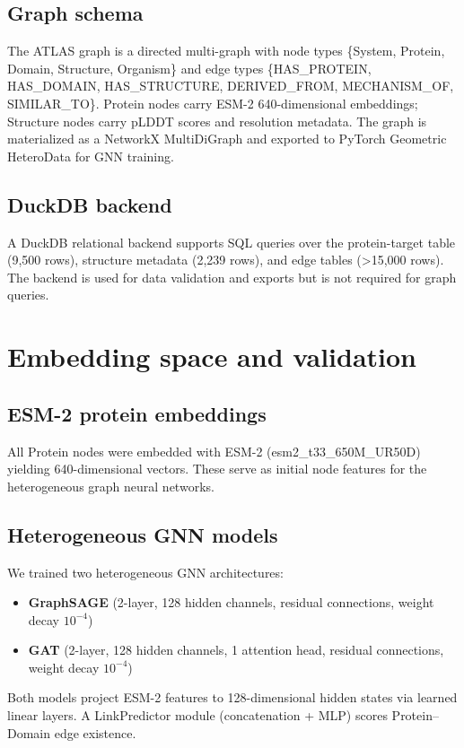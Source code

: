 \documentclass[11pt,a4paper]{article}
\begin{document}
\subsection*{Graph schema}
The ATLAS graph is a directed multi-graph with node types \{System, Protein, Domain, Structure, Organism\} and edge types \{HAS\_PROTEIN, HAS\_DOMAIN, HAS\_STRUCTURE, DERIVED\_FROM, MECHANISM\_OF, SIMILAR\_TO\}. Protein nodes carry ESM-2 640-dimensional embeddings; Structure nodes carry pLDDT scores and resolution metadata. The graph is materialized as a NetworkX MultiDiGraph and exported to PyTorch Geometric HeteroData for GNN training.

\subsection*{DuckDB backend}
A DuckDB relational backend supports SQL queries over the protein-target table (9,500 rows), structure metadata (2,239 rows), and edge tables (\textgreater{}15,000 rows). The backend is used for data validation and exports but is not required for graph queries.

\section*{Embedding space and validation}

\subsection*{ESM-2 protein embeddings}
All Protein nodes were embedded with ESM-2 (esm2\_t33\_650M\_UR50D) yielding 640-dimensional vectors. These serve as initial node features for the heterogeneous graph neural networks.

\subsection*{Heterogeneous GNN models}
We trained two heterogeneous GNN architectures:
\begin{itemize}
    \item \textbf{GraphSAGE} (2-layer, 128 hidden channels, residual connections, weight decay $10^{-4}$)
    \item \textbf{GAT} (2-layer, 128 hidden channels, 1 attention head, residual connections, weight decay $10^{-4}$)
\end{itemize}
Both models project ESM-2 features to 128-dimensional hidden states via learned linear layers. A LinkPredictor module (concatenation + MLP) scores Protein--Domain edge existence.
\end{document}
